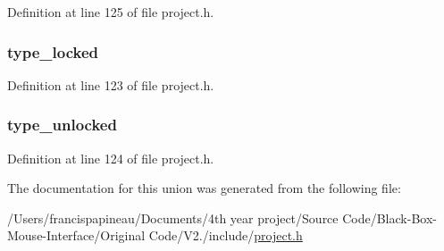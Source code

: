 \-Definition at line 125 of file project.\-h.

\hypertarget{unions__message__flags_ac13d4360deaf5e0a69a30a4b45ec42ed}{
\subsubsection[{type\-\_\-locked}]{ {\bf type\-\_\-locked}}}\label{unions__message__flags_ac13d4360deaf5e0a69a30a4b45ec42ed}


\-Definition at line 123 of file project.\-h.

\hypertarget{unions__message__flags_a4bfa5684da4ccc75b65c7f6929d6242a}{
\subsubsection[{type\-\_\-unlocked}]{ {\bf type\-\_\-unlocked}}}\label{unions__message__flags_a4bfa5684da4ccc75b65c7f6929d6242a}


\-Definition at line 124 of file project.\-h.



\-The documentation for this union was generated from the following file\-:\begin{DoxyCompactItemize}
\item 
/\-Users/francispapineau/\-Documents/4th year project/\-Source Code/\-Black-\/\-Box-\/\-Mouse-\/\-Interface/\-Original Code/\-V2./include/\hyperlink{project_8h}{project.\-h}\end{DoxyCompactItemize}
